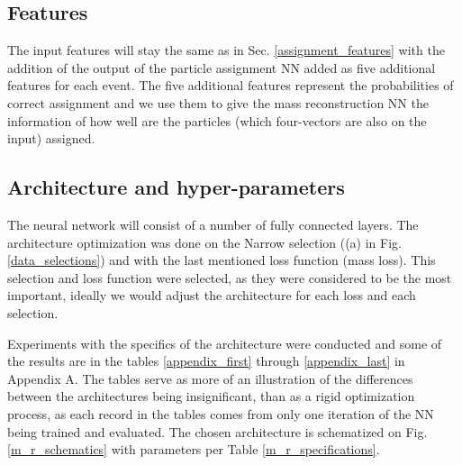 \documentclass{ctuthesis}
\begin{document}
\subsection{Features}
The input features will stay the same as in Sec. \ref{assignment_features} with the addition of the output of the particle assignment NN added as five additional features for each event. The five additional features represent the probabilities of correct assignment and we use them to give the mass reconstruction NN the information of how well are the particles (which four-vectors are also on the input) assigned.

\subsection{Architecture and hyper-parameters}
The neural network will consist of a number of fully connected layers. The architecture optimization was done on the Narrow selection ((a) in Fig. \ref{data_selections}) and with the last mentioned loss function (mass loss). This selection and loss function were selected, as they were considered to be the most important, ideally we would adjust the architecture for each loss and each selection.

Experiments with the specifics of the architecture were conducted and some of the results are in the tables \ref{appendix_first} through \ref{appendix_last} in Appendix A. The tables serve as more of an illustration of the differences between the architectures being insignificant, than as a rigid optimization process, as each record in the tables comes from only one iteration of the NN being trained and evaluated. The chosen architecture is schematized on Fig. \ref{m_r_schematics} with parameters per Table \ref{m_r_specifications}.
\begin{figure}[h]
\end{figure}
\end{document}
